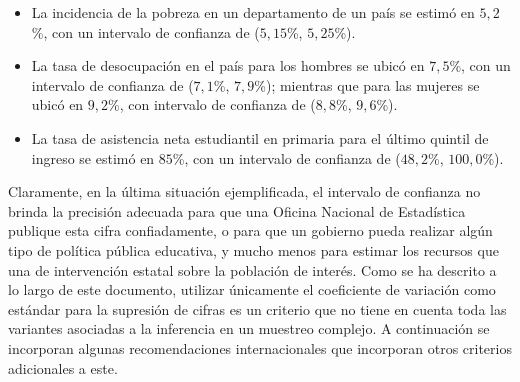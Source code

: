 \documentclass[12pt,spanish,]{book}
\providecommand{\tightlist}{%
  \setlength{\itemsep}{0pt}\setlength{\parskip}{0pt}}
\begin{document}
\begin{itemize}
\tightlist
\item
  La incidencia de la pobreza en un departamento de un país se estimó en \(5,2\)\%, con un intervalo de confianza de (\(5,15\)\%, \(5,25\)\%).
\item
  La tasa de desocupación en el país para los hombres se ubicó en \(7,5\)\%, con un intervalo de confianza de (\(7,1\)\%, \(7,9\)\%); mientras que para las mujeres se ubicó en \(9,2\)\%, con intervalo de confianza de (\(8,8\)\%, \(9,6\)\%).
\item
  La tasa de asistencia neta estudiantil en primaria para el último quintil de ingreso se estimó en \(85\)\%, con un intervalo de confianza de (\(48,2\)\%, \(100,0\)\%).
\end{itemize}

Claramente, en la última situación ejemplificada, el intervalo de confianza no brinda la precisión adecuada para que una Oficina Nacional de Estadística publique esta cifra confiadamente, o para que un gobierno pueda realizar algún tipo de política pública educativa, y mucho menos para estimar los recursos que una de intervención estatal sobre la población de interés. Como se ha descrito a lo largo de este documento, utilizar únicamente el coeficiente de variación como estándar para la supresión de cifras es un criterio que no tiene en cuenta toda las variantes asociadas a la inferencia en un muestreo complejo. A continuación se incorporan algunas recomendaciones internacionales que incorporan otros criterios adicionales a este.
\end{document}
